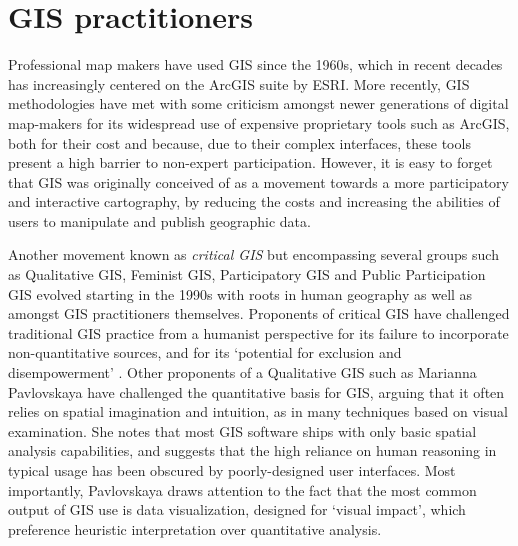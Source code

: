 \documentclass[11pt,oneside,notitlepage]{report}
\begin{document}
{{\section{\ac{GIS} practitioners}
\label{sec:gis}

Professional map makers have used \ac{GIS} since the 1960s, which in recent decades has increasingly centered on the ArcGIS suite by ESRI. More recently, \ac{GIS} methodologies have met with some criticism amongst newer generations of digital map-makers for its widespread use of expensive proprietary tools such as ArcGIS, both for their cost and because, due to their complex interfaces, these tools present a high barrier to non-expert participation. However, it is easy to forget that \ac{GIS} was originally conceived of as a movement towards a more participatory and interactive cartography, by reducing the costs and increasing the abilities of users to manipulate and publish geographic data.

Another movement known as \emph{critical GIS} but encompassing several groups such as Qualitative GIS, Feminist GIS, Participatory GIS and Public Participation GIS evolved starting in the 1990s with roots in human geography as well as amongst GIS practitioners themselves. Proponents of critical GIS have challenged traditional GIS practice from a humanist perspective for its failure to incorporate non-quantitative sources, and for its `potential for exclusion and disempowerment' \cite{elwood2009qualitative}. Other proponents of a Qualitative GIS such as Marianna Pavlovskaya have challenged the quantitative basis for GIS, arguing that it often relies on spatial imagination and intuition, as in many techniques based on visual examination. She notes that most GIS software ships with only basic spatial analysis capabilities, and suggests that the high reliance on human reasoning in typical usage has been obscured by poorly-designed user interfaces. Most importantly, Pavlovskaya draws attention to the fact that the most common output of GIS use is data visualization, designed for `visual impact', which preference heuristic interpretation over quantitative analysis. \cite{pavlovskaya2009nonquantitative} 

}}
\end{document}
